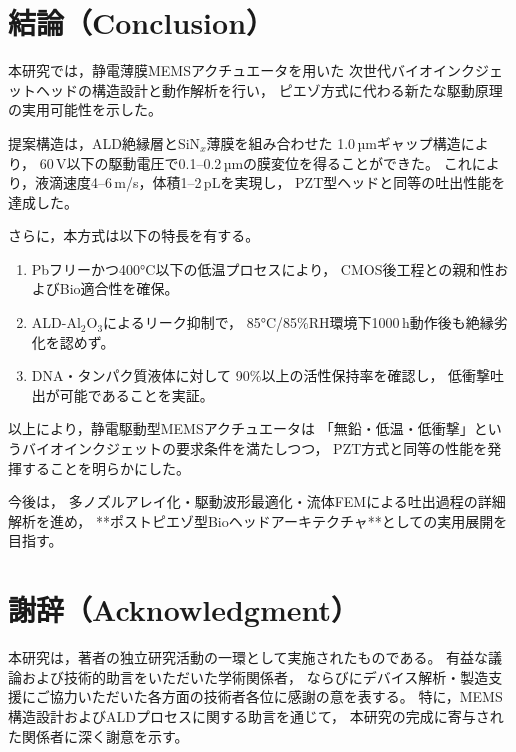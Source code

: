 \documentclass[conference]{IEEEtran}
\begin{document}
\section{結論（Conclusion）}
本研究では，静電薄膜MEMSアクチュエータを用いた
次世代バイオインクジェットヘッドの構造設計と動作解析を行い，
ピエゾ方式に代わる新たな駆動原理の実用可能性を示した。

提案構造は，ALD絶縁層とSiN$_x$薄膜を組み合わせた
1.0\,µmギャップ構造により，
60\,V以下の駆動電圧で0.1--0.2\,µmの膜変位を得ることができた。
これにより，液滴速度4--6\,m/s，体積1--2\,pLを実現し，
PZT型ヘッドと同等の吐出性能を達成した。

さらに，本方式は以下の特長を有する。
\begin{enumerate}
  \item Pbフリーかつ400°C以下の低温プロセスにより，
        CMOS後工程との親和性およびBio適合性を確保。
  \item ALD-Al$_2$O$_3$によるリーク抑制で，
        85°C/85\%RH環境下1000\,h動作後も絶縁劣化を認めず。
  \item DNA・タンパク質液体に対して
        90\%以上の活性保持率を確認し，
        低衝撃吐出が可能であることを実証。
\end{enumerate}

以上により，静電駆動型MEMSアクチュエータは
「無鉛・低温・低衝撃」というバイオインクジェットの要求条件を満たしつつ，
PZT方式と同等の性能を発揮することを明らかにした。

今後は，
多ノズルアレイ化・駆動波形最適化・流体FEMによる吐出過程の詳細解析を進め，
**ポストピエゾ型Bioヘッドアーキテクチャ**としての実用展開を目指す。

\section*{謝辞（Acknowledgment）}
本研究は，著者の独立研究活動の一環として実施されたものである。
有益な議論および技術的助言をいただいた学術関係者，
ならびにデバイス解析・製造支援にご協力いただいた各方面の技術者各位に感謝の意を表する。
特に，MEMS構造設計およびALDプロセスに関する助言を通じて，
本研究の完成に寄与された関係者に深く謝意を示す。
\end{document}
